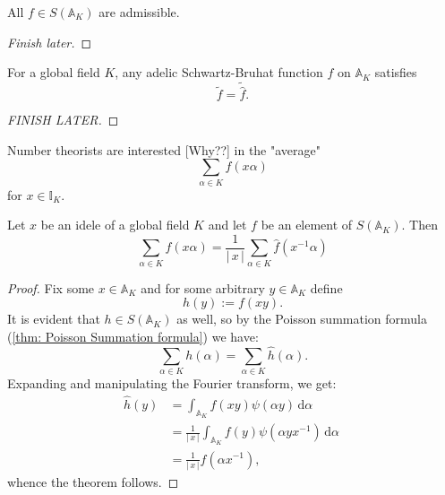 \documentclass[11pt, x11names, openany]{book}
\renewcommand{\aa}{\mathbb{A}}
\newcommand{\ii}{\mathbb{I}}
\newcommand{\abs}[1]{\left| \, #1  \,\right|}
\renewcommand{\hat}{\widehat}
\newcommand{\inv}[1]{#1^{-1}}
\renewcommand{\d}[1]{\, \mathrm{d}#1 \ }
\begin{document}
\begin{lemma}
\label{lemma: all adelic-SB-functions are admissible}
All $f \in S(\aa_K)$ are admissible.
\end{lemma}
\begin{proof}
    [Finish later]
\end{proof}

\begin{theorem}
\label{thm: Poisson Summation formula}
For a global field $K$, any adelic Schwartz-Bruhat function $f$ on $\aa_K$ satisfies
\begin{equation*}
    \widetilde{f} = \widetilde{\hat{f}}.
\end{equation*}
\end{theorem}
\begin{proof}
[FINISH LATER]
\end{proof}

Number theorists are interested [Why??] in the "average"
\begin{equation*}
    \sum_{\alpha \in K} f(x\alpha )
\end{equation*}
for $x \in \ii_K$. 

\begin{theorem}
\label{thm: Riemann-Roch}
Let $x$ be an idele of a global field $K$ and let $f$ be an element of $S(\aa_K)$. Then
\begin{equation*}
    \sum_{ \alpha \in K}f(x\alpha ) = \frac{1}{\abs{x}}\sum_{\alpha  \in K} \hat{f}(\inv{x}\alpha)
\end{equation*}
\end{theorem}
\begin{proof}
Fix some $x \in \aa_K$ and for some arbitrary $y \in \aa_K$ define
\begin{equation*}
    h(y) := f(xy).
\end{equation*}
It is evident that $h \in S(\aa_K)$ as well, so by the Poisson summation formula (\ref{thm: Poisson Summation formula}) we have:
\begin{equation*}
    \sum_{\alpha \in K} h(\alpha) = \sum_{\alpha \in K} \hat{h}(\alpha).
\end{equation*}
Expanding and manipulating the Fourier transform, we get:
\begin{align*}
    \hat{h}(y) &= \int_{\aa_K} f(xy) \psi(\alpha y) \d{\alpha}\\
    &= \frac{1}{\abs{x}} \int_{\aa_K} f(y) \psi(\alpha y \inv{x}) \d{\alpha}\\
    &= \frac{1}{\abs{x}} \hat{f}(\alpha \inv{x}),
\end{align*}
whence the theorem follows.
\end{proof}
\end{document}
